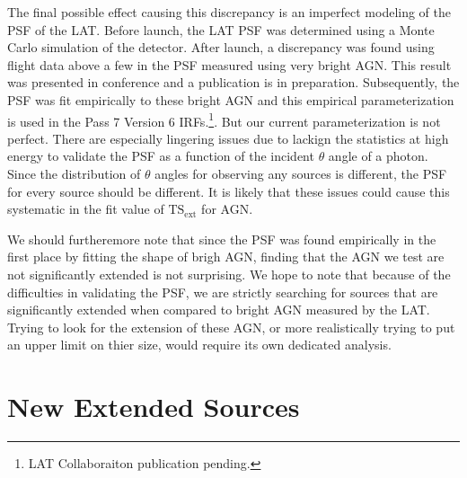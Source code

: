 \documentclass[12pt,preprint]{aastex}
\newcommand{\gev}{\text{GeV}\xspace}
\newcommand{\tsext}{{\ensuremath{\text{TS}_\text{ext}}}\xspace}
\begin{document}
The final possible effect causing this discrepancy is an imperfect
modeling of the PSF of the LAT.  Before launch, the LAT PSF
was determined using a Monte Carlo simulation of the detector.
After launch, a discrepancy was found using flight data above a
few \gev in the PSF measured using very bright AGN.  This result
was presented in conference and a publication is in preparation.
Subsequently, the PSF was fit empirically to these bright AGN and this
empirical parameterization is used in the Pass 7 Version 6 IRFs.\footnote{
LAT Collaboraiton publication pending.
}. But our current parameterization is not perfect. There are especially
lingering issues due to lackign the statistics at high energy to
validate the PSF as a function of the incident $\theta$ angle of a
photon. Since the distribution of $\theta$ angles for observing any
sources is different, the PSF for every source should be different.
It is likely that these issues could cause this systematic in the fit
value of \tsext for AGN.

We should furtheremore note that since the PSF was found empirically in
the first place by fitting the shape of brigh AGN, finding that the AGN we
test are not significantly extended is not surprising.  We hope to note
that because of the difficulties in validating the PSF, we are strictly
searching for sources that are significantly extended when compared to
bright AGN measured by the LAT. Trying to look for the extension of these
AGN, or more realistically trying to put an upper limit on thier size,
would require its own dedicated analysis.

\section{New Extended Sources}

\end{document}
